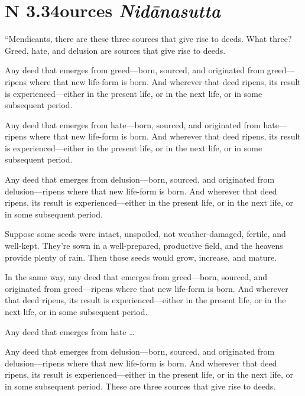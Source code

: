 \documentclass[12pt,openany]{book}%
\newcommand*{\suttatitleacronym}[1]{\smaller[2]{#1}\vspace*{.3em}}
\newcommand*{\suttatitletranslation}[1]{\linebreak{#1}}
\newcommand*{\suttatitleroot}[1]{\linebreak\smaller[2]\itshape{#1}}
\newcommand*{\tocacronym}[1]{\hspace*{-3.3em}{#1}\quad}
\newcommand*{\toctranslation}[1]{#1}
\newcommand*{\tocroot}[1]{(\textit{#1})}
\begin{document}
%
\section*{{\suttatitleacronym AN 3.34}{\suttatitletranslation Sources }{\suttatitleroot Nidānasutta}}
\addcontentsline{toc}{section}{\tocacronym{AN 3.34} \toctranslation{Sources } \tocroot{Nidānasutta}}

“Mendicants, there are these three sources that give rise to deeds. What three? Greed, hate, and delusion are sources that give rise to deeds. 

Any deed that emerges from greed—born, sourced, and originated from greed—ripens where that new life-form is born. And wherever that deed ripens, its result is experienced—either in the present life, or in the next life, or in some subsequent period. 

Any deed that emerges from hate—born, sourced, and originated from hate—ripens where that new life-form is born. And wherever that deed ripens, its result is experienced—either in the present life, or in the next life, or in some subsequent period. 

Any deed that emerges from delusion—born, sourced, and originated from delusion—ripens where that new life-form is born. And wherever that deed ripens, its result is experienced—either in the present life, or in the next life, or in some subsequent period. 

Suppose some seeds were intact, unspoiled, not weather-damaged, fertile, and well-kept. They’re sown in a well-prepared, productive field, and the heavens provide plenty of rain. Then those seeds would grow, increase, and mature. 

In the same way, any deed that emerges from greed—born, sourced, and originated from greed—ripens where that new life-form is born. And wherever that deed ripens, its result is experienced—either in the present life, or in the next life, or in some subsequent period. 

Any deed that emerges from hate … 

Any deed that emerges from delusion—born, sourced, and originated from delusion—ripens where that new life-form is born. And wherever that deed ripens, its result is experienced—either in the present life, or in the next life, or in some subsequent period. These are three sources that give rise to deeds. 
\end{document}

